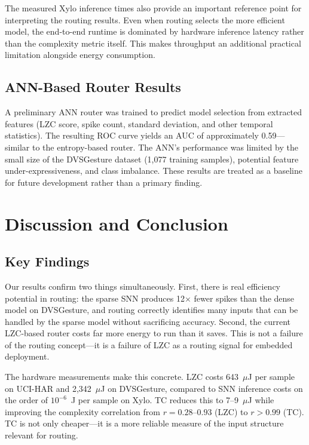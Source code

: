 \documentclass[conference]{IEEEtran}
\begin{document}
The measured Xylo inference times also provide an important reference point for interpreting the routing results. Even when routing selects the more efficient model, the end-to-end runtime is dominated by hardware inference latency rather than the complexity metric itself. This makes throughput an additional practical limitation alongside energy consumption.

\subsection{ANN-Based Router Results}

A preliminary ANN router was trained to predict model selection from extracted features (LZC score, spike count, standard deviation, and other temporal statistics). The resulting ROC curve yields an AUC of approximately 0.59—similar to the entropy-based router. The ANN's performance was limited by the small size of the DVSGesture dataset (1,077 training samples), potential feature under-expressiveness, and class imbalance. These results are treated as a baseline for future development rather than a primary finding.

\section{Discussion and Conclusion}

\subsection{Key Findings}

Our results confirm two things simultaneously. First, there is real efficiency potential in routing: the sparse SNN produces 12$\times$ fewer spikes than the dense model on DVSGesture, and routing correctly identifies many inputs that can be handled by the sparse model without sacrificing accuracy. Second, the current LZC-based router costs far more energy to run than it saves. This is not a failure of the routing concept—it is a failure of LZC as a routing signal for embedded deployment.

The hardware measurements make this concrete. LZC costs 643~$\mu$J per sample on UCI-HAR and 2,342~$\mu$J on DVSGesture, compared to SNN inference costs on the order of $10^{-6}$~J per sample on Xylo. TC reduces this to 7--9~$\mu$J while improving the complexity correlation from $r = 0.28$--$0.93$ (LZC) to $r > 0.99$ (TC). TC is not only cheaper—it is a more reliable measure of the input structure relevant for routing.
\end{document}
